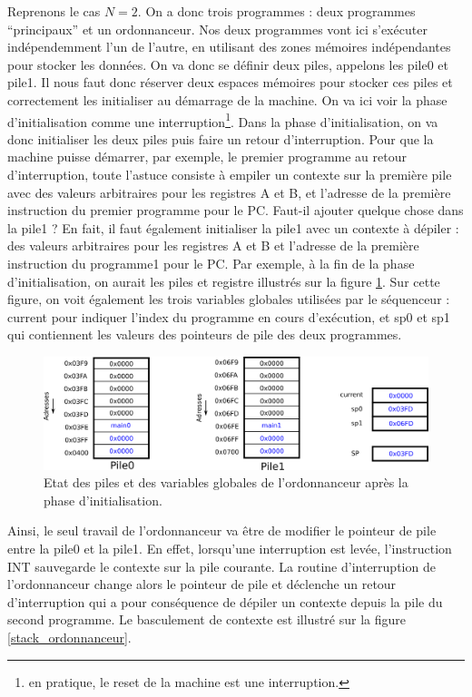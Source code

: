 Reprenons le cas $N=2$. On a donc trois programmes : deux programmes ``principaux'' et un ordonnanceur. Nos deux programmes vont ici s'exécuter indépendemment l'un de l'autre, en utilisant des zones mémoires indépendantes pour stocker les données. On va donc se définir deux piles, appelons les pile0 et pile1. Il nous faut donc réserver deux espaces mémoires pour stocker ces piles et correctement les initialiser au démarrage de la machine. On va ici voir la phase d'initialisation comme une interruption\footnote{en pratique, le reset de la machine est une interruption.}. Dans la phase d'initialisation, on va donc initialiser les deux piles puis faire un retour d'interruption. Pour que la machine puisse démarrer, par exemple, le premier programme au retour d'interruption, toute l'astuce consiste à empiler un contexte sur la première pile avec des valeurs arbitraires pour les registres A et B, et l'adresse de la première instruction du premier programme pour le PC. Faut-il ajouter quelque chose dans la pile1 ? En fait, il faut également initialiser la pile1 avec un contexte à dépiler : des valeurs arbitraires pour les registres A et B et l'adresse de la première instruction du programme1 pour le PC. Par exemple, à la fin de la phase d'initialisation, on aurait les piles et registre illustrés sur la figure \ref{stack_ordonnanceur_init}. Sur cette figure, on voit également les trois variables globales utilisées par le séquenceur : current pour indiquer l'index du programme en cours d'exécution, et sp0 et sp1 qui contiennent les valeurs des pointeurs de pile des deux programmes.


\begin{figure}[htbp]
\includegraphics[width=\linewidth]{Figs/stack_ordonnanceur_init.png}
\caption{\label{stack_ordonnanceur_init} Etat des piles et des variables globales de l'ordonnanceur après la phase d'initialisation.}
\end{figure}

Ainsi, le seul travail de l'ordonnanceur va être de modifier le pointeur de pile entre la pile0 et la pile1. En effet, lorsqu'une interruption est levée, l'instruction INT sauvegarde le contexte sur la pile courante. La routine d'interruption de l'ordonnanceur change alors le pointeur de pile et déclenche un retour d'interruption qui a pour conséquence de dépiler un contexte depuis la pile du second programme. Le basculement de contexte est illustré sur la figure \ref{stack_ordonnanceur}.

